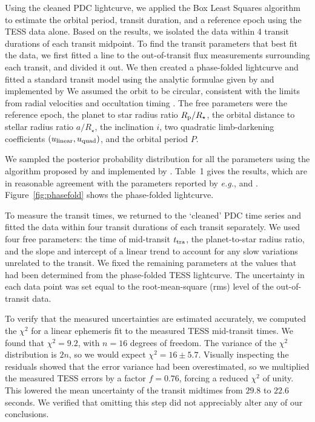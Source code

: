 \documentclass[12pt,twocolumn,tighten]{aastex62}
\begin{document}
Using the cleaned PDC lightcurve, we applied the Box Least Squares
algorithm \citep{kovacs_box-fitting_2002} to estimate the orbital
period, transit duration, and a reference epoch using the TESS data
alone.  Based on the results, we isolated the data within 4 transit
durations of each transit midpoint.  To find the transit parameters
that best fit the data, we first fitted a line to the out-of-transit
flux measurements surrounding each transit, and divided it out.  We
then created a phase-folded lightcurve 
and fitted a standard transit model using the analytic formulae given
by \citet{mandel_analytic_2002} and implemented by
We assumed the orbit to be circular, consistent with the limits from
radial velocities and occultation timing
\citep{beerer_secondary_2011,knutson_friends_2014,bonomo_gaps_2017}.
The free parameters were the reference epoch, the planet to star
radius ratio $R_{\rm p}/R_\star$, the orbital distance to stellar
radius ratio $a/R_\star$, the inclination $i$, two quadratic
limb-darkening coefficients $(u_{\rm linear}, u_{\rm quad})$, and the
orbital period $P$.

We sampled the posterior probability distribution for all the
parameters using the algorithm proposed by
\citet{goodman_ensemble_2010} and implemented by
.
Table~1 gives the results, which are in reasonable agreement with the
parameters reported by {\it e.g.},
\citet{southworth_high-precision_2009} and
\citet{huitson_gemini_2017}.  Figure~\ref{fig:phasefold} shows the
phase-folded lightcurve.

To measure the transit times, we returned to the `cleaned' PDC time
series and fitted the data within four transit durations of each
transit separately. We used four free parameters: the time of
mid-transit $t_{\rm tra}$, the planet-to-star radius ratio, and the
slope and intercept of a linear trend to account for any slow
variations unrelated to the transit.  We fixed the remaining
parameters at the values that had been determined from the
phase-folded TESS lightcurve.  The uncertainty in each
 data point was set equal to the root-mean-square
(rms) level of the out-of-transit data.

To verify that the measured uncertainties are estimated accurately, we
computed the $\chi^2$ for a linear
ephemeris fit to the measured TESS mid-transit times.  We found that
$\chi^2 = 9.2$, with $n=16$ degrees of freedom.  The variance of the
$\chi^2$ distribution is $2n$, so we would expect $\chi^2 = 16 \pm
5.7$.  Visually inspecting the residuals showed that the error
variance had been overestimated, so we multiplied the measured TESS
errors by a factor $f=0.76$, forcing a reduced $\chi^2$ of unity.
This lowered the mean uncertainty of the transit midtimes from $29.8$
to $22.6$ seconds.  We verified that omitting this step did not
appreciably alter any of our conclusions.
\end{document}
